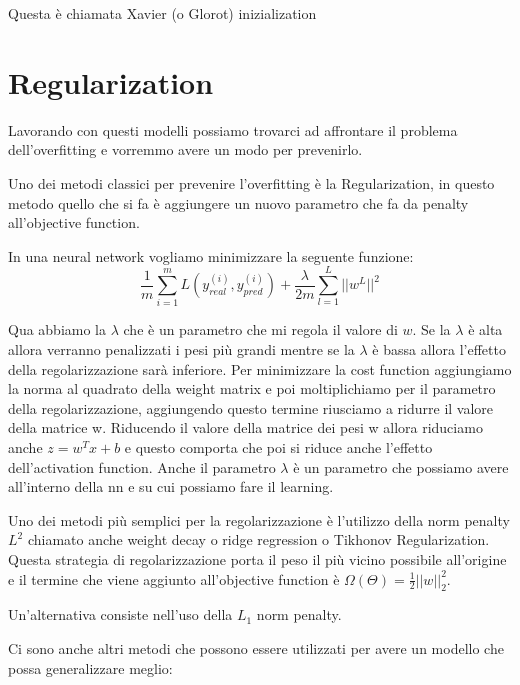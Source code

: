 \documentclass[14pt]{extreport}
\begin{document}
Questa è chiamata Xavier (o Glorot) inizialization

\section{Regularization}

Lavorando con questi modelli possiamo trovarci ad affrontare il problema dell'overfitting e vorremmo avere un modo per prevenirlo.

Uno dei metodi classici per prevenire l'overfitting è la Regularization, in questo metodo quello che si fa è aggiungere un nuovo parametro che fa da
penalty all'objective function.


In una neural network vogliamo minimizzare la seguente funzione:
$$\frac{1}{m}\sum_{i=1}^m L(y_{real}^{(i)},y_{pred}^{(i)}) + \frac{\lambda}{2m}\sum_{l=1}^L ||w^L||^2$$

Qua abbiamo la $\lambda$ che è un parametro che mi regola il valore di $w$. Se la $\lambda$ è alta allora verranno penalizzati i pesi più grandi
mentre se la $\lambda$ è bassa allora l'effetto della regolarizzazione sarà inferiore. Per minimizzare la cost function aggiungiamo la norma al
quadrato della weight matrix e poi moltiplichiamo per il parametro della regolarizzazione, aggiungendo questo termine riusciamo a ridurre il valore
della matrice w. Riducendo il valore della matrice dei pesi w allora riduciamo anche $z = w^Tx + b$ e questo comporta che poi si riduce anche
l'effetto dell'activation function. Anche il parametro $\lambda$ è un parametro che possiamo avere all'interno della nn e su cui possiamo fare il
learning.


Uno dei metodi più semplici per la regolarizzazione è l'utilizzo della norm penalty $L^2$ chiamato anche weight decay o ridge regression o Tikhonov
Regularization. Questa strategia di regolarizzazione porta il peso il più vicino possibile all'origine e il termine che viene aggiunto all'objective
function è $\Omega(\Theta) = \frac{1}{2}||w||_2^2$.

Un'alternativa consiste nell'uso della $L_1$ norm penalty.

Ci sono anche altri metodi che possono essere utilizzati per avere un modello che possa generalizzare meglio:
\end{document}
